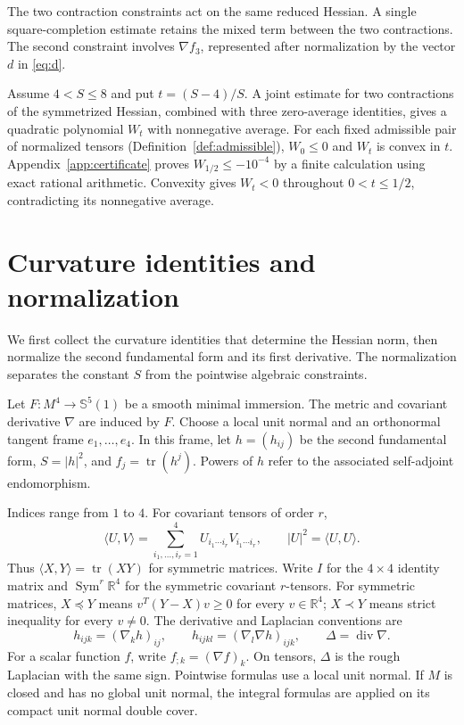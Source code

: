 \documentclass[11pt,a4paper]{amsart}
\numberwithin{equation}{section}
\theoremstyle{definition}
\theoremstyle{remark}
\DeclareMathOperator{\tr}{tr}
\DeclareMathOperator{\Sym}{Sym}
\DeclareMathOperator{\diver}{div}
\newcommand{\R}{\mathbb R}
\newcommand{\Sph}{\mathbb S}
\begin{document}
The two contraction constraints act on the same reduced Hessian.
A single square-completion estimate retains the mixed term between
the two contractions. The second constraint involves $\nabla f_3$,
represented after normalization by the vector $d$ in \eqref{eq:d}.

Assume $4<S\le8$ and put $t=(S-4)/S$. A joint estimate for two
contractions of the symmetrized Hessian, combined with three
zero-average identities, gives a quadratic polynomial $W_t$ with
nonnegative average. For each fixed admissible pair of normalized
tensors (Definition~\ref{def:admissible}), $W_0\le0$ and $W_t$ is convex in $t$.
Appendix~\ref{app:certificate} proves $W_{1/2}\le-10^{-4}$
by a finite calculation using exact rational arithmetic. Convexity gives
$W_t<0$ throughout $0<t\le1/2$, contradicting its nonnegative average.

\section{Curvature identities and normalization}\label{sec:curvature}
We first collect the curvature identities that determine the Hessian
norm, then normalize the second fundamental form and its first
derivative. The normalization separates the constant $S$ from the
pointwise algebraic constraints.

Let $F:M^4\to\Sph^5(1)$ be a smooth minimal immersion. The metric
and covariant derivative $\nabla$ are induced by $F$. Choose a local
unit normal and an orthonormal tangent frame $e_1,\ldots,e_4$.
In this frame, let $h=(h_{ij})$ be the second fundamental form,
$S=|h|^2$, and $f_j=\tr(h^j)$. Powers of $h$ refer to the
associated self-adjoint endomorphism.

Indices range from $1$ to $4$. For covariant tensors of order $r$,
\[
 \langle U,V\rangle=\sum_{i_1,\ldots,i_r=1}^4
 U_{i_1\cdots i_r}V_{i_1\cdots i_r},\qquad |U|^2=\langle U,U\rangle.
\]
Thus $\langle X,Y\rangle=\tr(XY)$ for symmetric matrices.
Write $I$ for the $4\times4$ identity matrix and $\Sym^r\R^4$ for
the symmetric covariant $r$-tensors. For symmetric matrices,
$X\preceq Y$ means $v^T(Y-X)v\ge0$ for every $v\in\R^4$;
$X\prec Y$ means strict inequality for every $v\ne0$.
The derivative and Laplacian conventions are
\[
 h_{ijk}=(\nabla_k h)_{ij},\qquad
 h_{ijkl}=(\nabla_l\nabla h)_{ijk},\qquad
 \Delta=\diver\nabla.
\]
For a scalar function $f$, write $f_{;k}=(\nabla f)_k$.
On tensors, $\Delta$ is the rough Laplacian with the same sign.
Pointwise formulas use a local unit normal. If $M$ is closed and has
no global unit normal, the integral formulas are applied on its compact
unit normal double cover.
\end{document}
